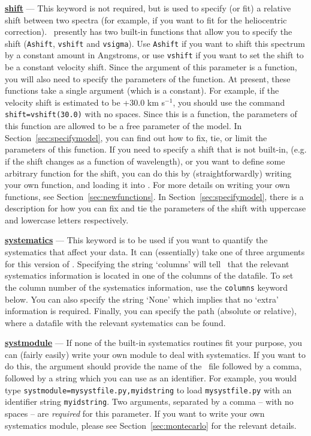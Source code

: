 \textbf{\underline{shift}} --- This keyword is not required, but is used to specify (or fit) a relative shift
     between two spectra (for example, if you want to fit for the heliocentric correction).
     \alis\ presently has two built-in functions that allow you to specify the shift
     (\texttt{Ashift}, \texttt{vshift} and \texttt{vsigma}). Use \texttt{Ashift} if you want to
     shift this spectrum by a constant amount in Angstroms, or use \texttt{vshift} if you want to
     set the shift to be a constant velocity shift. Since the argument
     of this parameter is a function, you will also need to specify the parameters of
     the function. At present, these functions take a single
     argument (which is a constant). For example, if the velocity shift is
     estimated to be +30.0 km s$^{-1}$, you should use the command
     \texttt{shift=vshift(30.0)} with no spaces. Since this is a function, the parameters
     of this function are allowed to be a free parameter of the model. In Section~\ref{sec:specifymodel},
     you can find out how to fix, tie, or limit the parameters of this function.
     If you need to specify a shift that is not built-in, (e.g. if the shift changes
     as a function of wavelength), or you want to define some arbitrary function for the shift,
     you can do this by (straightforwardly) writing your own function, and loading it into \alis.
     For more details on writing your own functions, see Section~\ref{sec:newfunctions}.
     In Section~\ref{sec:specifymodel}, there is a
     description for how you can fix and tie the parameters of the shift
     with uppercase and lowercase letters respectively.

\textbf{\underline{systematics}} --- This keyword is to be used if you want to quantify the
     systematics that affect your data. It can (essentially) take one of three arguments for
     this version of \alis. Specifying the string `columns' will tell \alis\ that the relevant
     systematics information is located in one of the columns of the datafile. To set the
     column number of the systematics information, use the \texttt{columns} keyword below.
     You can also specify the string `None' which implies that no `extra' information is required.
     Finally, you can specify the path (absolute or relative), where a datafile with the relevant
     systematics can be found.

\textbf{\underline{systmodule}} --- If none of the built-in systematics routines fit your purpose,
     you can (fairly easily) write your own module to deal with systematics. If you want to do this,
     the argument should provide the name of the \py\ file followed by a comma, followed by a
     string which you can use as an identifier. For example, you would type
     \texttt{systmodule=mysystfile.py,myidstring} to load \texttt{mysystfile.py} with an identifier string
     \texttt{myidstring}. Two arguments, separated by a comma -- with no spaces -- are
     \textit{required} for this parameter. If you want to write your own systematics module,
     please see Section~\ref{sec:montecarlo} for the relevant details.

